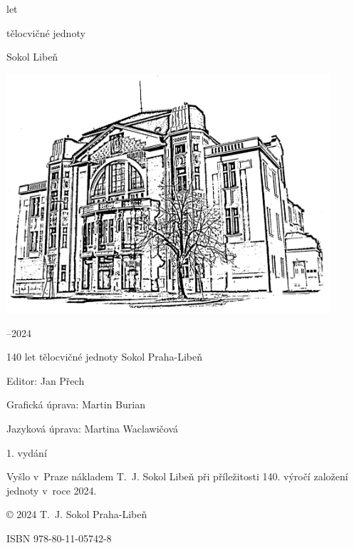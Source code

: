 \documentclass[a5paper, 12pt, twoside]{article}
\newcommand{\titlesize}{\fontsize{36pt}{54pt}}
\begin{document}
\begin{center}
  \setlength{\parskip}{6pt}
  \vspace*{18pt}
  {\fontsize{56pt}{66pt} let}

  {\titlesize\tyrs tělocvičné jednoty}
  
  {\titlesize\tyrs Sokol Libeň}

  \vspace*{\fill}

  \includegraphics*[width=0.9\textwidth]{./Sokolovna-kresba-black.png}

  \vspace*{\fill}

  {\titlesize{}–2024}
  \vspace*{-1cm}
\end{center}

\mbox{}
\clearpage

\vspace*{\fill}
{ \parindent0pt \parskip3pt
140 let tělocvičné jednoty Sokol Praha-Libeň

Editor: Jan Přech 

Grafická úprava: Martin Burian 

Jazyková úprava: Martina Waclawičová

1. vydání 

Vyšlo v~Praze nákladem T.~J. Sokol Libeň při příležitosti 140. výročí založení jednoty v~roce 2024.

© 2024 T.~J. Sokol Praha-Libeň

ISBN 978-80-11-05742-8
}
\clearpage


\tableofcontents
\end{document}

